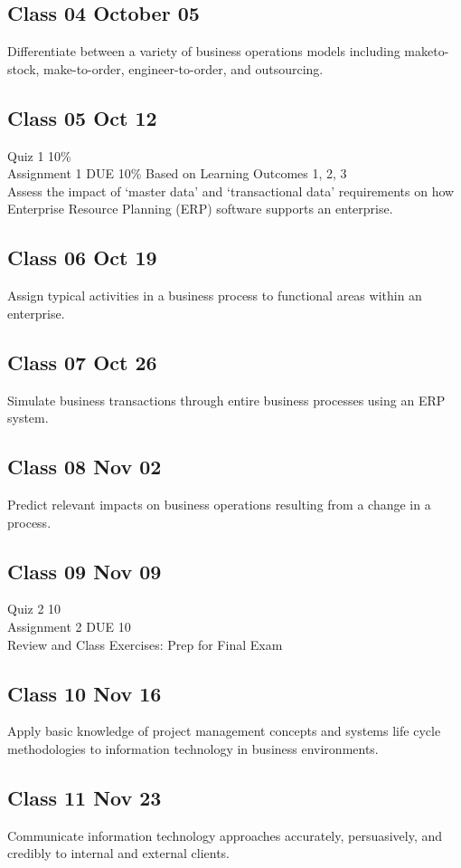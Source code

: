 \subsection{Class 04 October 05}
      Differentiate between a variety of business operations models including maketo-stock, make-to-order, engineer-to-order, and outsourcing.
\subsection{    Class 05 Oct 12}
      Quiz 1  10\%   \\
      Assignment 1 DUE  10\%    
        Based on Learning Outcomes 1, 2, 3   \\ 
        \newline
       Assess the impact of ‘master data’ and ‘transactional data’ requirements on how Enterprise Resource Planning (ERP) software supports an enterprise.
\subsection{    Class 06 Oct 19}
      Assign typical activities in a business process to functional areas within an enterprise.
\subsection{    Class 07 Oct 26}
      Simulate business transactions through entire business processes using an ERP system.
\subsection{    Class 08 Nov 02}
      Predict relevant impacts on business operations resulting from a change in a process.
\subsection{    Class 09 Nov 09}
     Quiz 2  10%
    \\  Assignment 2 DUE 10%
    \\  Review and Class Exercises: Prep for Final Exam
\subsection{    Class 10 Nov 16}
      Apply basic knowledge of project management concepts and systems life cycle methodologies to information technology in business environments.
\subsection{    Class 11 Nov 23}
      Communicate information technology approaches accurately, persuasively, and credibly to internal and external clients.
